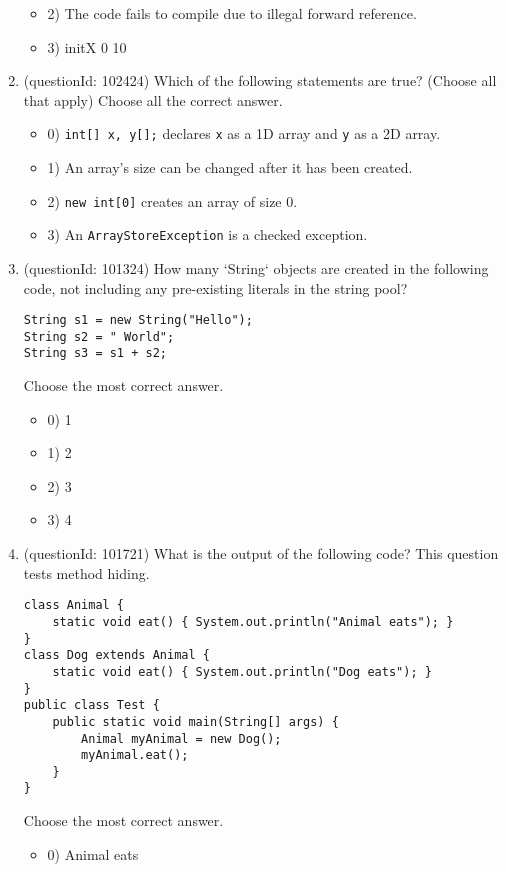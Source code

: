 \documentclass[12pt]{article}
\begin{document}
\begin{enumerate}[label=(\arabic*)]
\begin{itemize}
\item 2) The code fails to compile due to illegal forward reference.

\item 3) initX 0 10

\end{itemize}
\item (questionId: 102424) Which of the following statements are true? (Choose all that apply)
Choose all the correct answer.\begin{itemize}
\item 0) \verb|int[] x, y[];| declares \verb|x| as a 1D array and \verb|y| as a 2D array.

\item 1) An array's size can be changed after it has been created.

\item 2) \verb|new int[0]| creates an array of size 0.

\item 3) An \verb|ArrayStoreException| is a checked exception.

\end{itemize}
\item (questionId: 101324) How many `String` objects are created in the following code, not including any pre-existing literals in the string pool?
\begin{verbatim}
String s1 = new String("Hello");
String s2 = " World";
String s3 = s1 + s2;
\end{verbatim}
Choose the most correct answer. 
\begin{itemize}
\item 0) 1

\item 1) 2

\item 2) 3

\item 3) 4

\end{itemize}
\item (questionId: 101721) What is the output of the following code? This question tests method hiding.\n\begin{verbatim}
class Animal {
    static void eat() { System.out.println("Animal eats"); }
}
class Dog extends Animal {
    static void eat() { System.out.println("Dog eats"); }
}
public class Test {
    public static void main(String[] args) {
        Animal myAnimal = new Dog();
        myAnimal.eat();
    }
}
\end{verbatim}
Choose the most correct answer. 
\begin{itemize}
\item 0) Animal eats


\end{itemize}
\end{enumerate}
\end{document}
